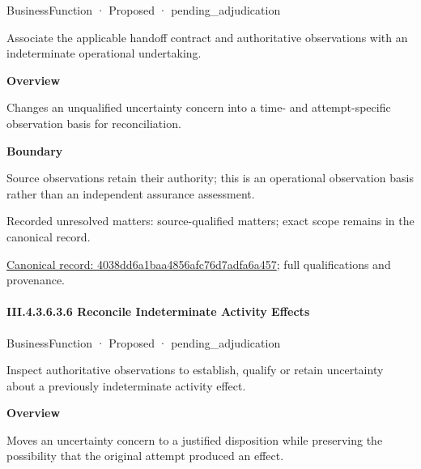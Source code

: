 \label{element:4038dd6a1baa4856afc76d7adfa6a457}
{\small BusinessFunction · Proposed · pending\_adjudication}\par

Associate the applicable handoff contract and authoritative observations with an indeterminate operational undertaking.



\textbf{Overview}



Changes an unqualified uncertainty concern into a time- and attempt-specific observation basis for reconciliation.



\textbf{Boundary}



Source observations retain their authority; this is an operational observation basis rather than an independent assurance assessment.


{\small Recorded unresolved matters: source-qualified matters; exact scope remains in the canonical record.}\par
{\footnotesize \href{../../../../continuum/business/business-function/4038dd6a1baa4856afc76d7adfa6a457.md}{Canonical record: 4038dd6a1baa4856afc76d7adfa6a457}; full qualifications and provenance.}\par
\paragraph*{III.4.3.6.3.6 Reconcile Indeterminate Activity Effects}
\label{navigation:III.4.3.6.3.6}

\label{element:eace49fe7b304ad786d460ccef622378}
{\small BusinessFunction · Proposed · pending\_adjudication}\par

Inspect authoritative observations to establish, qualify or retain uncertainty about a previously indeterminate activity effect.



\textbf{Overview}



Moves an uncertainty concern to a justified disposition while preserving the possibility that the original attempt produced an effect.



